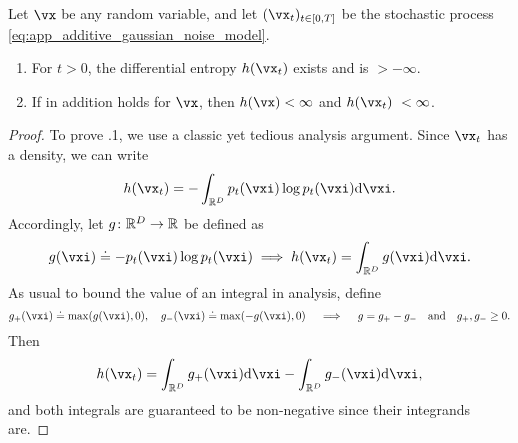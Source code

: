 \documentclass[../../book-main.tex]{subfiles}
\begin{document}
\begin{lemma}\label{lem:diffusion_entropy_exists}
    Let \(\vx\) be any random variable, and let \((\vx_{t})_{t \in [0, T]}\) be the stochastic process \eqref{eq:app_additive_gaussian_noise_model}. 
    \begin{enumerate}
        \item For \(t > 0\), the differential entropy \(h(\vx_{t})\) exists and is \(> -\infty\).
        \item If in addition  holds for \(\vx\), then \(h(\vx) < \infty\) and \(h(\vx_{t})\ < \infty\).
    \end{enumerate}
\end{lemma}
\begin{proof}
    To prove .1, we use a classic yet tedious analysis argument. Since \(\vx_{t}\) has a density, we can write 
    \begin{equation}
        h(\vx_{t}) = -\int_{\R^{D}}p_{t}(\vxi)\log p_{t}(\vxi) \odif{\vxi}.
    \end{equation}
    Accordingly, let \(g \colon \mathbb{R}^{D} \to \mathbb{R}\) be defined as 
    \begin{equation}
        g(\vxi) \doteq -p_{t}(\vxi)\log p_{t}(\vxi) \implies h(\vx_{t}) = \int_{\R^{D}}g(\vxi)\odif{\vxi}.
    \end{equation}
    As usual to bound the value of an integral in analysis, define 
    \begin{equation}
        g_{+}(\vxi) \doteq \max(g(\vxi), 0), \quad g_{-}(\vxi) \doteq \max(-g(\vxi), 0) \quad \implies \quad g = g_{+} - g_{-}\quad \text{and} \quad g_{+}, g_{-} \geq 0.
    \end{equation}
    Then 
    \begin{equation}
        h(\vx_{t}) = \int_{\R^{D}}g_{+}(\vxi)\odif{\vxi} - \int_{\R^{D}}g_{-}(\vxi)\odif{\vxi},
    \end{equation}
    and both integrals are guaranteed to be non-negative since their integrands are. 
    

\end{proof}
\end{document}
